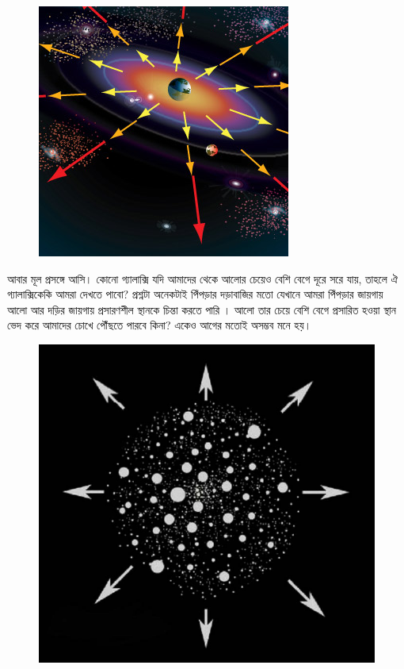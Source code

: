\documentclass[
]{book}
\begin{document}
\begin{figure}

{\centering \includegraphics[width=0.8\linewidth]{img/expa} 

}

\end{figure}

আবার মূল প্রসঙ্গে আসি। কোনো গ্যালাক্সি যদি আমাদের থেকে আলোর চেয়েও বেশি বেগে দূরে সরে যায়, তাহলে ঐ গ্যালাক্সিকেকি আমরা দেখতে পাবো? প্রশ্নটা অনেকটাই পিঁপড়ার দড়াবাজির মতো যেখানে আমরা পিঁপড়ার জায়গায় আলো আর দড়ির জায়গায় প্রসারণশীল স্থানকে চিন্তা করতে পারি । আলো তার চেয়ে বেশি বেগে প্রসারিত হওয়া স্থান ভেদ করে আমাদের চোখে পৌঁছতে পারবে কিনা? একেও আগের মতোই অসম্ভব মনে হয়।~

\begin{figure}

{\centering \includegraphics[width=0.8\linewidth]{img/exp2} 

}

\end{figure}
\end{document}
